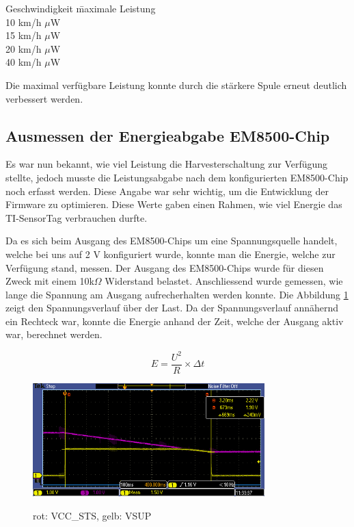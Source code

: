 \begin{minipage}{\textwidth}
\begin{tabbing}
    Geschwindigkeit   	\quad\= maximale Leistung    \\[0.8ex]
    10 km/h		         $\mu$W\\
	15 km/h		         $\mu$W\\
	20 km/h		         $\mu$W\\
	40 km/h		         $\mu$W\\
\end{tabbing}
\end{minipage}

Die maximal verfügbare Leistung konnte durch die stärkere Spule erneut deutlich verbessert werden. 

\subsection{Ausmessen der Energieabgabe EM8500-Chip}
\label{em_enerige_ausgang}

Es war nun bekannt, wie viel Leistung die Harvesterschaltung zur Verfügung stellte, jedoch musste die Leistungsabgabe nach dem konfigurierten EM8500-Chip noch erfasst werden. Diese Angabe war sehr wichtig, um die Entwicklung der Firmware zu optimieren. Diese Werte gaben einen Rahmen, wie viel Energie das TI-SensorTag verbrauchen durfte.

Da es sich beim Ausgang des EM8500-Chips um eine Spannungsquelle handelt, welche bei uns auf 2 V konfiguriert wurde, konnte man die Energie, welche zur Verfügung stand, messen. Der Ausgang des EM8500-Chips wurde für diesen Zweck mit einem 10k$\Omega$ Widerstand belastet. Anschliessend wurde gemessen, wie lange die Spannung am Ausgang aufrecherhalten werden konnte. Die Abbildung \ref{EnergieEMChip15kmh} zeigt den Spannungsverlauf über der Last. Da der Spannungsverlauf annähernd ein Rechteck war, konnte die Energie anhand der Zeit, welche der Ausgang aktiv war, berechnet werden.

\begin{equation}
	E = \frac{U^2}{R}  \times \Delta t
\end{equation}

\begin{figure}[ht]
  \includegraphics[width=0.80\textwidth]{3Vorgehen/imag/EnergieEMChip15kmh.PNG}
  \label{EnergieEMChip15kmh} 
  \caption{rot: VCC\_STS, gelb: VSUP}
\end{figure}



